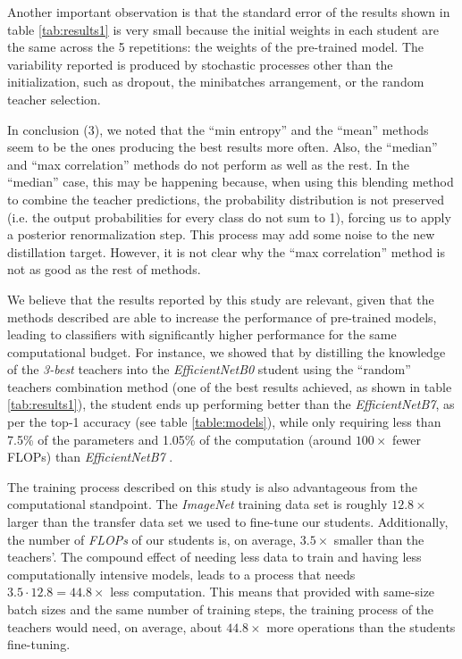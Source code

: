 \documentclass{elsarticle}
\begin{document}
	Another important observation is that the standard error of the results shown in table \ref{tab:results1} is very small because the initial weights in each student are the same across the 5 repetitions: the weights of the pre-trained model. The variability reported is produced by stochastic processes other than the initialization, such as dropout, the minibatches arrangement, or the random teacher selection.

	In conclusion (3), we noted that the ``min entropy'' and the ``mean'' methods seem to be the ones producing the best results more often. Also, the ``median'' and ``max correlation'' methods do not perform as well as the rest. In the ``median'' case, this may be happening because, when using this blending method to combine the teacher predictions, the probability distribution is not preserved (i.e. the output probabilities for every class do not sum to 1), forcing us to apply a posterior renormalization step. This process may add some noise to the new distillation target. However, it is not clear why the ``max correlation'' method is not as good as the rest of methods.   
	
	
	We believe that the results reported by this study are relevant, given that the methods described are able to increase the performance of pre-trained models, leading to classifiers with significantly higher performance for the same computational budget.   For instance, we showed that by distilling the knowledge of the \textit{3-best} teachers into the \textit{EfficientNetB0} student using the ``random'' teachers combination method (one of the best results achieved, as shown in table \ref{tab:results1}), the student ends up performing better than the \textit{EfficientNetB7}, as per the top-1 accuracy (see table \ref{table:models}), while only requiring less than 7.5\% of the parameters and 1.05\% of the computation (around $100\times$ fewer FLOPs) than \textit{EfficientNetB7} \cite{tan2019}.
	
	The training process described on this study is also advantageous from the computational standpoint. The \textit{ImageNet} training data set is roughly $12.8\times$ larger than the transfer data set we used to fine-tune our students. Additionally, the number of \textit{FLOPs} of our students is, on average, $3.5\times$ smaller than the teachers'. The compound effect of needing less data to train and having less computationally intensive models, leads to a process that needs $3.5 \cdot 12.8 = 44.8\times$ less computation. This means that provided with same-size batch sizes and the same number of training steps, the training process of the teachers would need, on average, about $44.8\times$ more operations than the students fine-tuning. 
	
\end{document}
